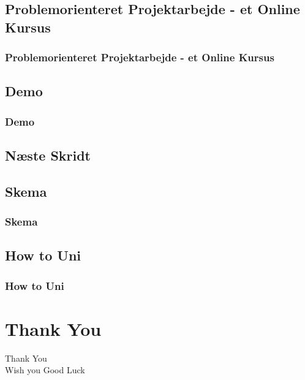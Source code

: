 \documentclass[t, aspectratio=169]{beamer}
\begin{document}
\subsection{Problemorienteret Projektarbejde - et Online Kursus}
\begin{frame}[fragile]
  \frametitle{Problemorienteret Projektarbejde - et Online Kursus}
  \vspace{1mm}
  
\end{frame}

\subsection{Demo}
\begin{frame}[fragile]
  \frametitle{Demo}
  \vspace{1mm}
  
\end{frame}

\subsection{Næste Skridt}
\begin{frame}[fragile]
  \frametitle{}
  \vspace{1mm}
  
\end{frame}

\subsection{Skema}
\begin{frame}[fragile]
  \frametitle{Skema}
  \vspace{1mm}
  
\end{frame}

\subsection{How to Uni}
\begin{frame}[fragile]
  \frametitle{How to Uni}
  \vspace{1mm}
  
\end{frame}

\section{Thank You}
\begin{frame}
  \vspace{25mm}
  \begin{center}
    \Huge{Thank You\\Wish you Good Luck \smiley{}}
  \end{center}
\end{frame}
\end{document}
